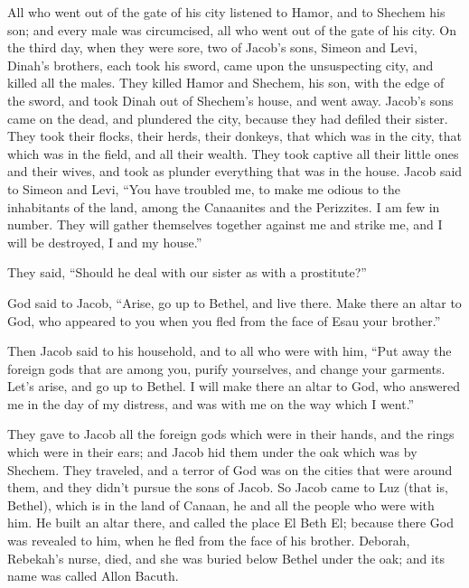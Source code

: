 \myverse{}All who went out of the gate of his city listened to Hamor, and to Shechem his son; and every male was circumcised, all who went out of the gate of his city. \myverse{}On the third day, when they were sore, two of Jacob’s sons, Simeon and Levi, Dinah’s brothers, each took his sword, came upon the unsuspecting city, and killed all the males. \myverse{}They killed Hamor and Shechem, his son, with the edge of the sword, and took Dinah out of Shechem’s house, and went away. \myverse{}Jacob’s sons came on the dead, and plundered the city, because they had defiled their sister. \myverse{}They took their flocks, their herds, their donkeys, that which was in the city, that which was in the field, \myverse{}and all their wealth. They took captive all their little ones and their wives, and took as plunder everything that was in the house. \myverse{}Jacob said to Simeon and Levi, “You have troubled me, to make me odious to the inhabitants of the land, among the Canaanites and the Perizzites. I am few in number. They will gather themselves together against me and strike me, and I will be destroyed, I and my house.”

\myverse{}They said, “Should he deal with our sister as with a prostitute?”

\mychapter{}
\myverse*{}God said to Jacob, “Arise, go up to Bethel, and live there. Make there an altar to God, who appeared to you when you fled from the face of Esau your brother.”

\myverse{}Then Jacob said to his household, and to all who were with him, “Put away the foreign gods that are among you, purify yourselves, and change your garments.   \myverse{}Let’s arise, and go up to Bethel. I will make there an altar to God, who answered me in the day of my distress, and was with me on the way which I went.”

\myverse{}They gave to Jacob all the foreign gods which were in their hands, and the rings which were in their ears; and Jacob hid them under the oak which was by Shechem.   \myverse{}They traveled, and a terror of God was on the cities that were around them, and they didn’t pursue the sons of Jacob.   \myverse{}So Jacob came to Luz (that is, Bethel), which is in the land of Canaan, he and all the people who were with him.   \myverse{}He built an altar there, and called the place El Beth El; because there God was revealed to him, when he fled from the face of his brother.   \myverse{}Deborah, Rebekah’s nurse, died, and she was buried below Bethel under the oak; and its name was called Allon Bacuth.

